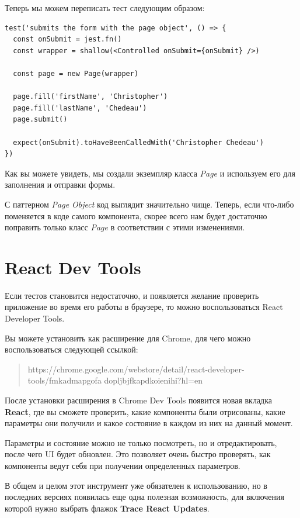 Теперь мы можем переписать тест следующим образом:

\begin{lstlisting}
test('submits the form with the page object', () => {
  const onSubmit = jest.fn()
  const wrapper = shallow(<Controlled onSubmit={onSubmit} />)
  
  const page = new Page(wrapper)
  
  page.fill('firstName', 'Christopher')
  page.fill('lastName', 'Chedeau')
  page.submit()
  
  expect(onSubmit).toHaveBeenCalledWith('Christopher Chedeau')
})
\end{lstlisting}

Как вы можете увидеть, мы создали экземпляр класса \textit{Page} и используем его для заполнения и отправки формы.

С паттерном \textit{Page Object} код выглядит значительно чище. Теперь, если что-либо поменяется в коде самого компонента, скорее всего нам будет достаточно поправить только класс \textit{Page} в соответствии с этими изменениями.

\section{React Dev Tools}

Если тестов становится недостаточно, и появляется желание проверить приложение во время его работы в браузере, то можно воспользоваться React Developer Tools.

Вы можете установить как расширение для Chrome, для чего можно воспользоваться следующей ссылкой: 

\begin{quotation}
https://chrome.google.com/webstore/detail/react-developer-tools/fmkadmapgofa dopljbjfkapdkoienihi?hl=en
\end{quotation}

После установки расширения в Chrome Dev Tools появится новая вкладка \textbf{React}, где вы сможете проверить, какие компоненты были отрисованы, какие параметры они получили и какое состояние в каждом из них на данный момент.

Параметры и состояние можно не только посмотреть, но и отредактировать, после чего UI будет обновлен. Это позволяет очень быстро проверять, как компоненты ведут себя при получении определенных параметров.

В общем и целом этот инструмент уже обязателен к использованию, но в последних версиях появилась еще одна полезная возможность, для включения которой нужно выбрать флажок \textbf{Trace React Updates}.

